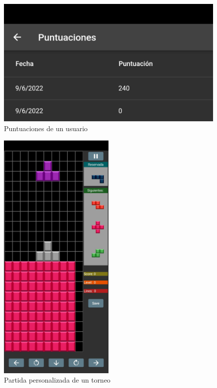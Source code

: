 \documentclass{article}
\begin{document}
\begin{figure}[H]
  \includegraphics[width=\textwidth]{imagenes/clasInd.jpeg}
  \caption{Puntuaciones de un usuario} 
\end{figure} 

\begin{figure}[H]
  \centering
  \includegraphics[width=0.5\textwidth]{imagenes/piezasRosas.jpeg}
  \caption{Partida personalizada de un torneo} 
\end{figure}
\end{document}
